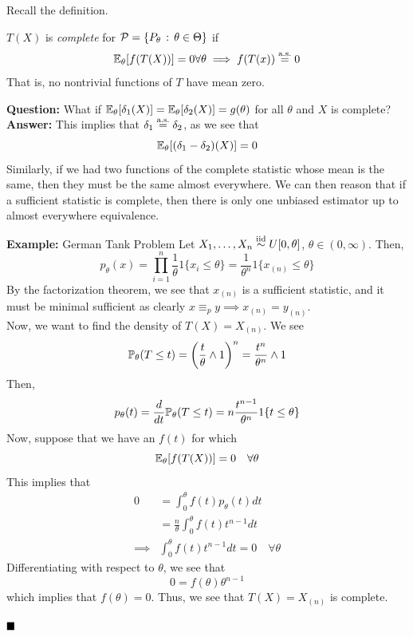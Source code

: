 
Recall the definition.

\begin{definition}
    $T(X)$ is \emph{complete} for $\cal{P} = \{P_{\theta} \col \theta \in \Theta\}$ if
    \[ \bb{E}_{\theta}[f(T(X))] = 0 \forall \theta \implies f(T(x)) \overset{\tt{a.s.}}{=} 0 \]
    That is, no nontrivial functions of $T$ have mean zero. 
\end{definition}

\textbf{Question:} What if $\bb{E}_{\theta}[\delta_1(X)] = \bb{E}_{\theta}[\delta_2(X)] = g(\theta)$ for all $\theta$ and $X$ is complete?\\

\textbf{Answer:} This implies that $\delta_1 \overset{\tt{a.s.}}{=} \delta_2$, as we see that
\[ \bb{E}_{\theta}[(\delta_1 - \delta_2)(X)] = 0\]
Similarly, if we had two functions of the complete statistic whose mean is the same, then they must be the same almost everywhere. We can then reason that if a sufficient statistic is complete, then there is only one unbiased estimator up to almost everywhere equivalence.\\

\begin{example}{\textbf{Example:} German Tank Problem}
    Let $X_1, \ldots, X_n \iidsim U[0, \theta]$, $\theta \in (0, \infty)$. Then,
    \[ p_{\theta}(x) = \prod_{i = 1}^{n} \frac{1}{\theta}1\{x_i \leq \theta\} = \frac{1}{\theta^{n}}1\{x_{(n)} \leq \theta\} \]
    By the factorization theorem, we see that $x_{(n)}$ is a sufficient statistic, and it must be minimal sufficient as clearly $x \equiv_{p} y \implies x_{(n)} = y_{(n)}$. \\

    Now, we want to find the density of $T(X) = X_{(n)}$. We see
    \begin{align*}
        \bb{P}_{\theta}(T \leq t) = \left(\frac{t}{\theta} \wedge 1\right)^{n} = \frac{t^{n}}{\theta^{n}} \wedge 1 
    \end{align*}
    Then, 
    \[ p_{\theta}(t) = \frac{d}{dt} \bb{P}_{\theta}(T \leq t) = n\frac{t^{n - 1}}{\theta^{n}}1\{t \leq \theta\} \]
    Now, suppose that we have an $f(t)$ for which
    \[ \bb{E}_{\theta}[f(T(X))] = 0\quad \forall \theta \]
    This implies that
    \begin{align*}
        0 &= \int_{0}^{\theta} f(t)p_{\theta}(t)dt\\
        &= \frac{n}{\theta}\int_{0}^{\theta}f(t)t^{n - 1}dt\\
        \implies& \int_{0}^{\theta} f(t)t^{n - 1}dt = 0\quad \forall \theta
    \end{align*}
    Differentiating with respect to $\theta$, we see that
    \[ 0 = f(\theta)\theta^{n - 1} \]
    which implies that $f(\theta) = 0$. Thus, we see that $T(X) = X_{(n)}$ is complete.

    $\qed$
\end{example}

